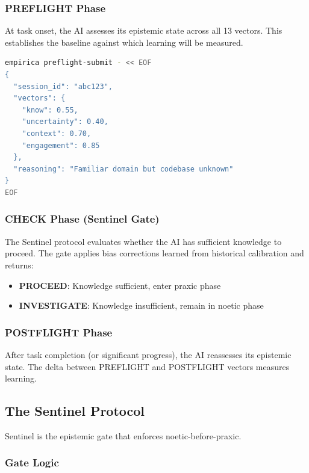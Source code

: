 \subsubsection{PREFLIGHT Phase}

At task onset, the AI assesses its epistemic state across all 13 vectors. This establishes the baseline against which learning will be measured.

\begin{lstlisting}[language=bash,caption={Example PREFLIGHT submission},showspaces=false,showstringspaces=false]
empirica preflight-submit - << EOF
{
  "session_id": "abc123",
  "vectors": {
    "know": 0.55,
    "uncertainty": 0.40,
    "context": 0.70,
    "engagement": 0.85
  },
  "reasoning": "Familiar domain but codebase unknown"
}
EOF
\end{lstlisting}

\subsubsection{CHECK Phase (Sentinel Gate)}

The Sentinel protocol evaluates whether the AI has sufficient knowledge to proceed. The gate applies bias corrections learned from historical calibration and returns:
\begin{itemize}
    \item \textbf{PROCEED}: Knowledge sufficient, enter praxic phase
    \item \textbf{INVESTIGATE}: Knowledge insufficient, remain in noetic phase
\end{itemize}

\subsubsection{POSTFLIGHT Phase}

After task completion (or significant progress), the AI reassesses its epistemic state. The delta between PREFLIGHT and POSTFLIGHT vectors measures learning.

\subsection{The Sentinel Protocol}

Sentinel is the epistemic gate that enforces noetic-before-praxic.

\subsubsection{Gate Logic}


